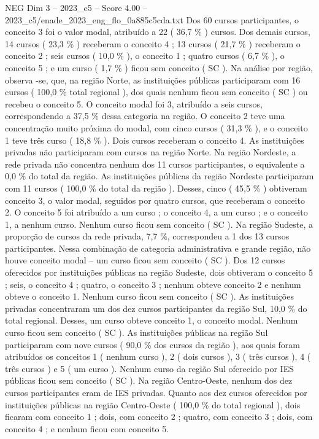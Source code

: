 \begin{textsample}{NEG Dim 3 – 2023\_c5 – Score 4.00 – 2023\_c5/enade\_2023\_eng\_flo\_0a885c5cda.txt}
Dos 60 cursos participantes, o conceito 3 foi o valor modal, atribuído a 22 ( 36,7 \% ) cursos.
Dos demais cursos, 14 cursos ( 23,3 \% ) receberam o conceito 4 ; 13 cursos ( 21,7 \% ) receberam o conceito 2 ; seis cursos ( 10,0 \% ), o conceito 1 ; quatro cursos ( 6,7 \% ), o conceito 5 ; e um curso ( 1,7 \% ) ficou sem conceito ( SC ).
Na análise por região, observa -se, que, na região Norte, as instituições públicas participaram com 16 cursos ( 100,0 \% total regional ), dos quais nenhum ficou sem conceito ( SC ) ou recebeu o conceito 5.
O conceito modal foi 3, atribuído a seis cursos, correspondendo a 37,5 \% dessa categoria na região.
O conceito 2 teve uma concentração muito próxima do modal, com cinco cursos ( 31,3 \% ), e o conceito 1 teve três curso ( 18,8 \% ).
Dois cursos receberam o conceito 4.
As instituições privadas não participaram com cursos na região Norte.
Na região Nordeste, a rede privada não concentra nenhum dos 11 cursos participantes, o equivalente a 0,0 \% do total da região.
As instituições públicas da região Nordeste participaram com 11 cursos ( 100,0 \% do total da região ).
Desses, cinco ( 45,5 \% ) obtiveram conceito 3, o valor modal, seguidos por quatro cursos, que receberam o conceito 2.
O conceito 5 foi atribuído a um curso ; o conceito 4, a um curso ; e o conceito 1, a nenhum curso.
Nenhum curso ficou sem conceito ( SC ).
Na região Sudeste, a proporção de cursos da rede privada, 7,7 \%, correspondeu a 1 dos 13 cursos participantes.
Nessa combinação de categoria administrativa e grande região, não houve conceito modal – um curso ficou sem conceito ( SC ).
Dos 12 cursos oferecidos por instituições públicas na região Sudeste, dois obtiveram o conceito 5 ; seis, o conceito 4 ; quatro, o conceito 3 ; nenhum obteve conceito 2 e nenhum obteve o conceito 1.
Nenhum curso ficou sem conceito ( SC ).
As instituições privadas concentraram um dos dez cursos participantes da região Sul, 10,0 \% do total regional.
Desses, um curso obteve conceito 1, o conceito modal.
Nenhum curso ficou sem conceito ( SC ).
As instituições públicas na região Sul participaram com nove cursos ( 90,0 \% dos cursos da região ), aos quais foram atribuídos os conceitos 1 ( nenhum curso ), 2 ( dois cursos ), 3 ( três cursos ), 4 ( três cursos ) e 5 ( um curso ).
Nenhum curso da região Sul oferecido por IES públicas ficou sem conceito ( SC ).
Na região Centro-Oeste, nenhum dos dez cursos participantes eram de IES privadas.
Quanto aos dez cursos oferecidos por instituições públicas na região Centro-Oeste ( 100,0 \% do total regional ), dois ficaram com conceito 1 ; dois, com conceito 2 ; quatro, com conceito 3 ; dois, com conceito 4 ; e nenhum ficou com conceito 5.

\end{textsample}
